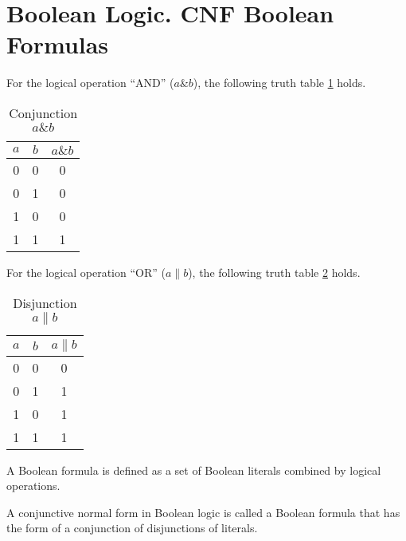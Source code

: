 \section{Boolean Logic. CNF Boolean Formulas}

\begin{definition}
For the logical operation ``AND'' ($a \& b$), the following truth table
\ref{tblAddAlgoAND} holds.
\begin{table}
\centering
\begin{tabular}{|c|c|c|}
\hline
$a$ & $b$ & $a \& b$ \\ \hline
0  & 0 & 0 \\
0  & 1 & 0 \\
1  & 0 & 0 \\
1  & 1 & 1 \\ \hline
\end{tabular}
\caption{Conjunction $a \& b$}
\label{tblAddAlgoAND}
\end{table}
\end{definition}

\begin{definition}
For the logical operation ``OR'' ($a \| b$), the following truth table
\ref{tblAddAlgoOR} holds.
\begin{table}
\centering
\begin{tabular}{|c|c|c|}
\hline
$a$ & $b$ & $a \| b$ \\ \hline
0  & 0 & 0 \\
0  & 1 & 1 \\
1  & 0 & 1 \\
1  & 1 & 1 \\ \hline
\end{tabular}
\caption{Disjunction $a \| b$}
\label{tblAddAlgoOR}
\end{table}
\end{definition}

\begin{definition}
A Boolean formula is defined as a set of Boolean literals
combined by logical operations.
\end{definition}

\begin{definition}
A conjunctive normal form in Boolean logic is called a Boolean
formula that has the form of a conjunction of disjunctions of literals.
\end{definition}

